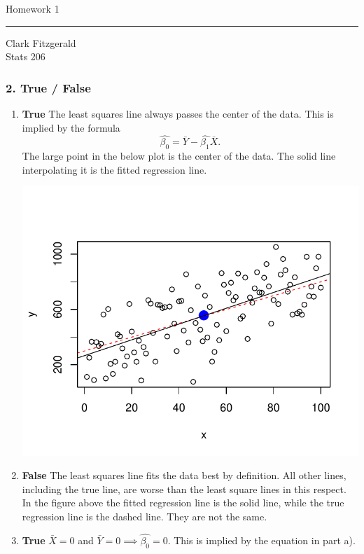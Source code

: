 \documentclass[12pt]{article}
\begin{document}
\begin{center}
    {\Large Homework 1}\\
    \bigskip
    \bigskip
    \hrule
    \medskip
    Clark Fitzgerald\\
    Stats 206
\end{center}

\subsubsection*{2. True / False}
\begin{enumerate}[label=\alph*]
\item  \textbf{True} The least squares line always passes the center of the data.
This is implied by the formula
\[
    \hat{\beta_0} = \bar{Y} - \hat{\beta_1} \bar{X}.
\]
The large point in the below plot is the center of the data. The solid line
interpolating it is the fitted regression line.

\centerline{\includegraphics{regress.pdf}}

\item \textbf{False} The least squares line fits the data
best by definition. All other lines, including the true line, are worse
than the least square lines in this respect. 
In the figure above the fitted regression line is the solid line,
while the true regression line is the dashed line. They are not the same.

\item \textbf{True} $\bar{X} = 0$ and $\bar{Y} = 0 \implies \hat{\beta_0} =
0$. This is implied by the equation in part a).


\end{enumerate}
\end{document}
